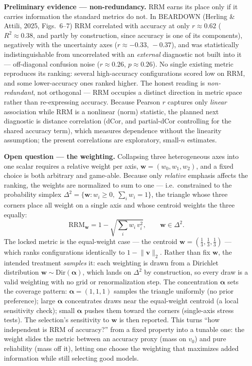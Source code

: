 \documentclass[11pt]{article}
\begin{document}
\smallskip
\noindent\textbf{Preliminary evidence --- non-redundancy.} RRM earns its place only if it carries information the standard metrics do not. In BEARDOWN (Herling \& Attili, 2025, Figs.~6--7) RRM correlated with accuracy at only $r\approx0.62$ ($R^2\approx0.38$, and partly by construction, since accuracy is one of its components), negatively with the uncertainty axes ($r\approx-0.33,\,-0.37$), and was statistically indistinguishable from uncorrelated with an \emph{external} diagnostic not built into it --- off-diagonal confusion noise ($r\approx0.26$, $p\approx0.26$). No single existing metric reproduces its ranking: several high-accuracy configurations scored low on RRM, and some lower-accuracy ones ranked higher. The honest reading is \emph{non-redundant}, not orthogonal --- RRM occupies a distinct direction in metric space rather than re-expressing accuracy. Because Pearson $r$ captures only \emph{linear} association while RRM is a nonlinear (norm) statistic, the planned next diagnostic is distance correlation (dCor, and partial-dCor controlling for the shared accuracy term), which measures dependence without the linearity assumption; the present correlations are exploratory, small-$n$ estimates.

\smallskip
\noindent\textbf{Open question --- the weighting.} Collapsing three heterogeneous axes into one scalar requires a relative weight per axis, $\mathbf{w}=(w_0,w_1,w_2)$, and a fixed choice is both arbitrary and game-able. Because only \emph{relative} emphasis affects the ranking, the weights are normalized to sum to one --- i.e.\ constrained to the probability simplex $\Delta^{2}=\{\mathbf{w}:w_i\ge 0,\ \sum_i w_i=1\}$, the triangle whose three corners place all weight on a single axis and whose centroid weights the three equally:
\[
  \mathrm{RRM}_{\mathbf{w}} = 1-\sqrt{\textstyle\sum_i w_i\,v_i^{2}},
  \qquad \mathbf{w}\in\Delta^{2}.
\]
The locked metric is the equal-weight case --- the centroid $\mathbf{w}=(\tfrac13,\tfrac13,\tfrac13)$ --- which ranks configurations identically to $1-\lVert\mathbf{v}\rVert_2$. Rather than fix $\mathbf{w}$, the intended treatment \emph{samples} it: each weighting is drawn from a Dirichlet distribution $\mathbf{w}\sim\mathrm{Dir}(\boldsymbol{\alpha})$, which lands on $\Delta^{2}$ by construction, so every draw is a valid weighting with no grid or renormalization step. The concentration $\boldsymbol{\alpha}$ sets the coverage pattern: $\boldsymbol{\alpha}=(1,1,1)$ samples the triangle uniformly (no prior preference); large $\boldsymbol{\alpha}$ concentrates draws near the equal-weight centroid (a local sensitivity check); small $\boldsymbol{\alpha}$ pushes them toward the corners (single-axis stress tests). The selection's sensitivity to $\mathbf{w}$ is then reported. This turns ``how independent is RRM of accuracy?'' from a fixed property into a tunable one: the weight slides the metric between an accuracy proxy (mass on $v_0$) and pure reliability (mass off it), letting one choose the weighting that maximizes added information while still selecting good models.
\end{document}
